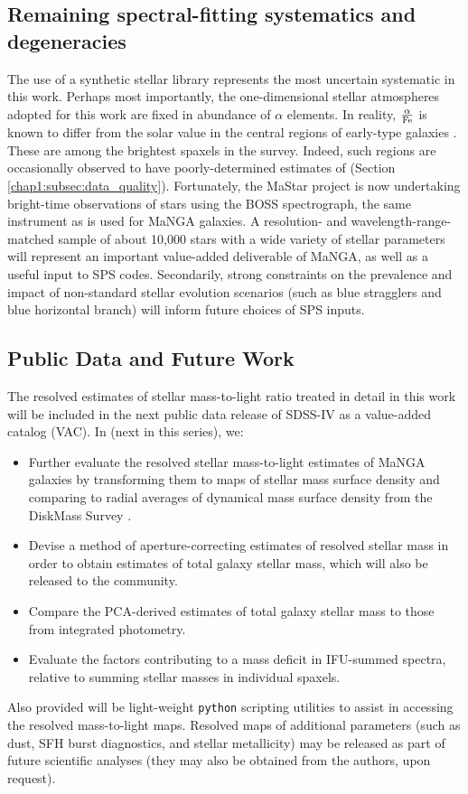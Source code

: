 \subsection{Remaining spectral-fitting systematics and degeneracies}

The use of a synthetic stellar library represents the most uncertain systematic in this work. Perhaps most importantly, the one-dimensional stellar atmospheres adopted for this work are fixed in abundance of $\alpha$ elements. In reality, ${\rm \frac{\alpha}{Fe}}$ is known to differ from the solar value in the central regions of early-type galaxies \citep{worthey_faber_92, matteucci_94, thomas_greggio_bender_99}. These are among the brightest spaxels in the survey. Indeed, such regions are occasionally observed to have poorly-determined estimates of  (Section \ref{chap1:subsec:data_quality}). Fortunately, the MaStar project is now undertaking bright-time observations of stars using the BOSS spectrograph, the same instrument as is used for MaNGA galaxies. A resolution- and wavelength-range-matched sample of about 10,000 stars with a wide variety of stellar parameters will represent an important value-added deliverable of MaNGA, as well as a useful input to SPS codes. Secondarily, strong constraints on the prevalence and impact of non-standard stellar evolution scenarios (such as blue stragglers and blue horizontal branch) will inform future choices of SPS inputs.

\subsection{Public Data and Future Work}
The resolved estimates of stellar mass-to-light ratio treated in detail in this work will be included in the next public data release of SDSS-IV as a value-added catalog (VAC). In  (next in this series), we:

\begin{itemize}
    \item Further evaluate the resolved stellar mass-to-light estimates of MaNGA galaxies by transforming them to maps of stellar mass surface density and comparing to radial averages of dynamical mass surface density from the DiskMass Survey \citep{diskmass_i}.
    \item Devise a method of aperture-correcting estimates of resolved stellar mass in order to obtain estimates of total galaxy stellar mass, which will also be released to the community.
    \item Compare the PCA-derived estimates of total galaxy stellar mass to those from integrated photometry.
    \item Evaluate the factors contributing to a mass deficit in IFU-summed spectra, relative to summing stellar masses in individual spaxels.
\end{itemize}

Also provided will be light-weight \texttt{python} scripting utilities to assist in accessing the resolved mass-to-light maps. Resolved maps of additional parameters (such as dust, SFH burst diagnostics, and stellar metallicity) may be released as part of future scientific analyses (they may also be obtained from the authors, upon request).